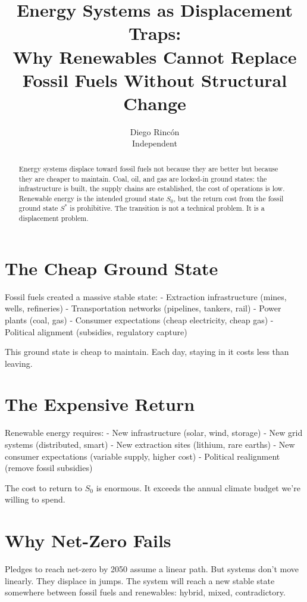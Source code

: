 \documentclass[12pt]{article}
\title{Energy Systems as Displacement Traps:\\
Why Renewables Cannot Replace Fossil Fuels Without Structural Change}
\author{Diego Rincón\\
\small Independent}
\date{}
\begin{document}
\maketitle

\begin{abstract}
Energy systems displace toward fossil fuels not because they are better but because they are cheaper to maintain. Coal, oil, and gas are locked-in ground states: the infrastructure is built, the supply chains are established, the cost of operations is low. Renewable energy is the intended ground state $S_0$, but the return cost from the fossil ground state $S^*$ is prohibitive. The transition is not a technical problem. It is a displacement problem.
\end{abstract}

\section{The Cheap Ground State}

Fossil fuels created a massive stable state:
- Extraction infrastructure (mines, wells, refineries)
- Transportation networks (pipelines, tankers, rail)
- Power plants (coal, gas)
- Consumer expectations (cheap electricity, cheap gas)
- Political alignment (subsidies, regulatory capture)

This ground state is cheap to maintain. Each day, staying in it costs less than leaving.

\section{The Expensive Return}

Renewable energy requires:
- New infrastructure (solar, wind, storage)
- New grid systems (distributed, smart)
- New extraction sites (lithium, rare earths)
- New consumer expectations (variable supply, higher cost)
- Political realignment (remove fossil subsidies)

The cost to return to $S_0$ is enormous. It exceeds the annual climate budget we're willing to spend.

\section{Why Net-Zero Fails}

Pledges to reach net-zero by 2050 assume a linear path. But systems don't move linearly. They displace in jumps. The system will reach a new stable state somewhere between fossil fuels and renewables: hybrid, mixed, contradictory.
\end{document}
